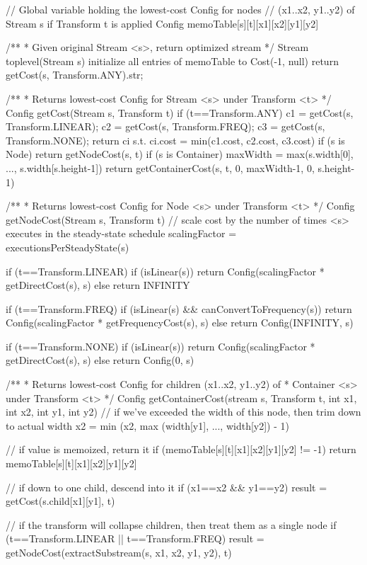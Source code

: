 // Global variable holding the lowest-cost Config for nodes
// (x1..x2, y1..y2) of Stream s if Transform t is applied
Config memoTable[s][t][x1][x2][y1][y2]

/** 
 * Given original Stream <s>, return optimized stream
 */
Stream toplevel(Stream s)
  initialize all entries of memoTable to Cost(-1, null)
  return getCost(s, Transform.ANY).str;

/**
 * Returns lowest-cost Config for Stream <s> under Transform <t>
 */
Config getCost(Stream s, Transform t)
  if (t==Transform.ANY)
    c1 = getCost(s, Transform.LINEAR);
    c2 = getCost(s, Transform.FREQ);
    c3 = getCost(s, Transform.NONE);
    return ci s.t. ci.cost = min(c1.cost, c2.cost, c3.cost)
  if (s is Node)
    return getNodeCost(s, t)
  if (s is Container)
    maxWidth = max(s.width[0], ..., s.width[s.height-1])
    return getContainerCost(s, t, 0, maxWidth-1, 0, s.height-1)

/**
 * Returns lowest-cost Config for Node <s> under Transform <t>
 */ 
Config getNodeCost(Stream s, Transform t)
  // scale cost by the number of times <s> executes in the steady-state schedule
  scalingFactor = executionsPerSteadyState(s)

  if (t==Transform.LINEAR)
    if (isLinear(s))
      return Config(scalingFactor * getDirectCost(s), s)
    else
      return INFINITY

  if (t==Transform.FREQ)
    if (isLinear(s) && canConvertToFrequency(s))
      return Config(scalingFactor * getFrequencyCost(s), s)
    else 
      return Config(INFINITY, s)

  if (t==Transform.NONE)
    if (isLinear(s))
      return Config(scalingFactor * getDirectCost(s), s)
    else
      return Config(0, s)

/** 
 * Returns lowest-cost Config for children (x1..x2, y1..y2) of
 * Container <s> under Transform <t>
 */
Config getContainerCost(stream s, Transform t, int x1, int x2, int y1, int y2)
  // if we've exceeded the width of this node, then trim down to actual width
  x2 = min (x2, max (width[y1], ..., width[y2]) - 1)

  // if value is memoized, return it
  if (memoTable[s][t][x1][x2][y1][y2] != -1)
    return memoTable[s][t][x1][x2][y1][y2]

  // if down to one child, descend into it
  if (x1==x2 && y1==y2)
    result = getCost(s.child[x1][y1], t)

  // if the transform will collapse children, then treat them as a single node
  if (t==Transform.LINEAR || t==Transform.FREQ)
    result = getNodeCost(extractSubstream(s, x1, x2, y1, y2), t)

